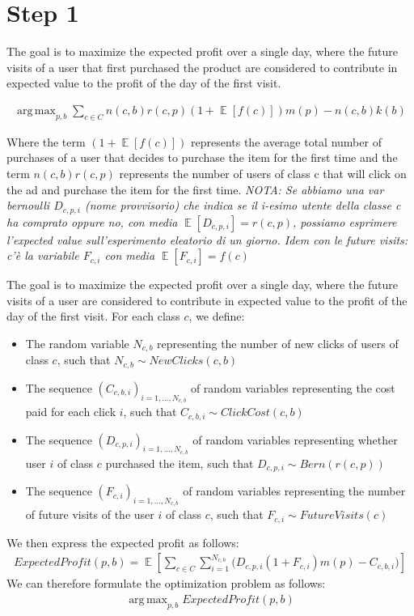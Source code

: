 \documentclass[11pt]{article} %
\DeclareMathOperator{\EX}{\mathbb{E}}
\DeclareMathOperator*{\argmax}{arg\,max}
\begin{document}
\section{Step 1}
{\color{red}
The goal is to maximize the expected profit over a single day, where the future visits of a user that first purchased the product are considered to contribute in expected value to the profit of the day of the first visit.


\begin{align*}
\argmax_{p,b}{\sum_{c \in C}{n(c,b)r(c,p)(1+\EX[f(c)])m(p)-n(c,b)k(b)}}
\end{align*}

Where the term $(1+\EX[f(c)])$ represents the average total number of purchases of a user that decides to purchase the item for the first time and the term $n(c,b)r(c,p)$ represents the number of users of class c that will click on the ad and purchase the item for the first time.
\newline
\newline
\textit{NOTA: Se abbiamo una var bernoulli $D_{c,p,i}$ (nome provvisorio) che indica se il i-esimo utente della classe c ha comprato oppure no, con media $\EX[D_{c,p,i}]=r(c,p)$, possiamo esprimere l'expected value sull'esperimento eleatorio di un giorno.
Idem con le future visits: c'è la variabile $F_{c,i}$ con media $\EX[F_{c,i}]=f(c)$}
}
\newline
\newline
The goal is to maximize the expected profit over a single day, where the future visits of a user are considered to contribute in expected value to the profit of the day of the first visit.
\newline
\newline
For each class $c$, we define:
\begin{itemize}
\item The random variable $N_{c,b}$ representing the number of new clicks of users of class $c$, such that $N_{c,b} \sim NewClicks(c,b)$
\item The sequence $(C_{c,b,i})_{i=1,...,N_{c,b}}$ of random variables representing the cost paid for each click $i$, such that $C_{c,b,i}\sim ClickCost(c,b)$
\item The sequence $(D_{c,p,i})_{i=1,...,N_{c,b}}$ of random variables representing whether user $i$ of class $c$ purchased the item, such that $D_{c,p,i}\sim Bern(r(c,p))$
\item The sequence $(F_{c,i})_{i=1,...,N_{c,b}}$ of random variables representing the number of future visits of the user $i$ of class $c$, such that $F_{c,i}\sim FutureVisits(c)$
\end{itemize}
We then express the expected profit as follows:
\begin{align*}
ExpectedProfit(p,b) = \EX\left[\sum_{c \in C}{\sum_{i =1}^{N_{c,b}}{\bigg( D_{c,p,i}(1+F_{c,i})m(p)-C_{c,b,i}\bigg)}}\right]
\end{align*}
We can therefore formulate the optimization problem as follows:
\begin{align*}
\argmax_{p,b}{ExpectedProfit(p,b)}
\end{align*}
\end{document}
